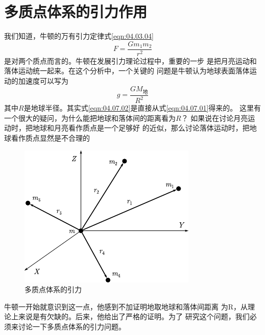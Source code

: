\section{多质点体系的引力作用}\label{sec:04.07}

我们知道，牛顿的万有引力定律式\eqref{eqn:04.03.04} 
\begin{equation}\label{eqn:04.07.01}
	F = \frac { G m _ { 1 } m _ { 2 } } { r ^ { 2 } }  
\end{equation}
是对两个质点而言的。牛顿在发展引力理论过程中，重要的一步
是把月亮运动和落体运动统一起来。在这个分析中，一个关键的
问题是牛顿认为地球表面落体运动的加速度可以写为
\begin{equation}\label{eqn:04.07.02}
	g = \frac { G M _ \text{地} } { R ^ { 2 } } 
\end{equation}
其中$ R $是地球半径。其实式\eqref{eqn:04.07.02}是直接从式\eqref{eqn:04.07.01}得来的。
这里有一个很大的疑问，为什么能把地球和落体间的距离看为$ R $？
如果说在讨论月亮运动时，把地球和月亮看作质点是一个足够好
的近似，那么讨论落体运动时，把地球看作质点显然是不合理的
\begin{figure}
	\centering
	\includegraphics{figure/fig04.09}
	\caption{多质点体系的引力}
	\label{fig:04.09}
\end{figure}
牛顿一开始就意识到这一点，他感到不加证明地取地球和落体间距离
为R，从理论上来说是有欠缺的。后来，他给出了严格的证明。为了
研究这个问题，我们必须来讨论一下多质点体系的引力问题。

